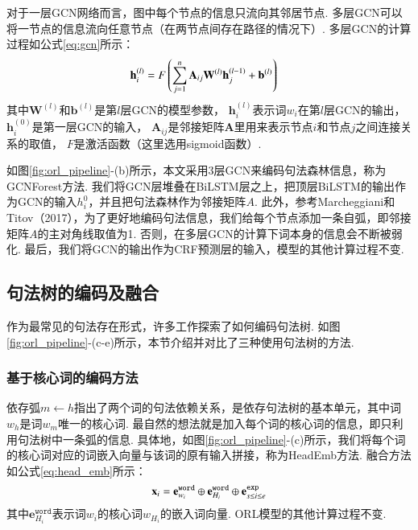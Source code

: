 对于一层GCN网络而言，图中每个节点的信息只流向其邻居节点. 多层GCN可以将一节点的信息流向任意节点（在两节点间存在路径的情况下）. 多层GCN的计算过程如公式\ref{eq:gcn}所示：
\begin{equation}\label{eq:gcn}
    \setlength{\abovedisplayskip}{9pt}
    \setlength{\belowdisplayskip}{9pt}
    \begin{split}
        \mathbf{h}_i^{(l)} &= F\left(  \sum_{j=1}^n \mathbf{A}_{ij} \mathbf{W}^{(l)}\mathbf{h}_j^{(l-1)}+\mathbf{b}^{(l)} \right)
    \end{split}
\end{equation}
其中$\mathbf{W}^{(l)}$和$\mathbf{b}^{(l)}$是第$l$层GCN的模型参数， $\mathbf{h}_i^{(l)}$表示词$w_i$在第$l$层GCN的输出， $\mathbf{h}_i^{(0)}$是第一层GCN的输入， $\mathbf{A}_{ij}$是邻接矩阵$\mathbf{A}$里用来表示节点$i$和节点$j$之间连接关系的取值， $F$是激活函数（这里选用sigmoid函数）.

如图\ref{fig:orl_pipeline}-(b)所示，本文采用3层GCN来编码句法森林信息，称为GCNForest方法.
我们将GCN层堆叠在BiLSTM层之上，把顶层BiLSTM的输出作为GCN的输入$h_i^0$，并且把句法森林作为邻接矩阵$A$.
此外，参考Marcheggiani和Titov（2017），为了更好地编码句法信息，我们给每个节点添加一条自弧，即邻接矩阵$A$的主对角线取值为1. 否则，在多层GCN的计算下词本身的信息会不断被弱化. 最后，我们将GCN的输出作为CRF预测层的输入，模型的其他计算过程不变.


%
\subsection{句法树的编码及融合}
作为最常见的句法存在形式，许多工作探索了如何编码句法树. 如图\ref{fig:orl_pipeline}-(c-e)所示，本节介绍并对比了三种使用句法树的方法.

\subsubsection{基于核心词的编码方法}

依存弧$m \leftarrow h$指出了两个词的句法依赖关系，是依存句法树的基本单元，其中词$w_h$是词$w_m$唯一的核心词.
最自然的想法就是加入每个词的核心词的信息，即只利用句法树中一条弧的信息.
具体地，如图\ref{fig:orl_pipeline}-(c)所示，我们将每个词的核心词对应的词嵌入向量与该词的原有输入拼接，称为HeadEmb方法. 融合方法如公式\ref{eq:head_emb}所示：
\begin{equation}
    \setlength{\abovedisplayskip}{9pt}
    \setlength{\belowdisplayskip}{9pt}
    \label{eq:head_emb}
    \mathbf{x}_i = \mathbf{e}_{w_i}^{\texttt{word}} \oplus \mathbf{e}_{H_i}^{\texttt{word}} \oplus \mathbf{e}_{s\leq i\leq e}^{\texttt{exp}}
\end{equation}
其中$\mathbf{e}_{H_i}^{\texttt{word}}$表示词$w_i$的核心词$w_{H_i}$的嵌入词向量. ORL模型的其他计算过程不变.

